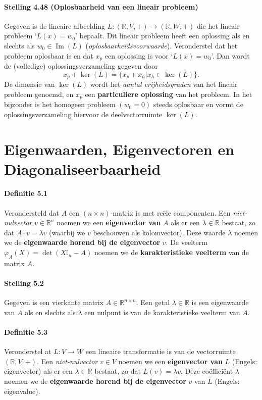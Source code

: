 \documentclass[11pt,oneside,a4paper]{article}
\DeclareMathOperator{\Ima}{Im}
\begin{document}
	\paragraph{Stelling 4.48 (Oplosbaarheid van een lineair probleem)}
		Gegeven is de lineaire afbeelding $L: (\mathbb{R}, V, +) \to (\mathbb{R}, W, +)$ die het lineair probleem `$L(x) = w_0$' bepaalt. Dit lineair probleem heeft een oplossing als en slechts als $w_0 \in \Ima(L)$ (\textit{oplosbaarheidsvoorwaarde}). Veronderstel dat het probleem oplosbaar is en dat $x_p$ een oplossing is voor `$L(x) = w_0$'. Dan wordt de (volledige) oplossingsverzameling gegeven door $$x_p + \ker(L) = \{x_p + x_h | x_h \in \ker(L)\}.$$ De dimensie van $\ker(L)$ wordt het \textit{aantal vrijheidsgraden} van het lineair probleem genoemd, en $x_p$ een \textbf{particuliere oplossing} van het probleem. In het bijzonder is het homogeen probleem $(w_0 = 0)$ steeds oplosbaar en vormt de oplossingsverzameling hiervoor de deelvectorruimte $\ker(L)$.
	
	\section{Eigenwaarden, Eigenvectoren en Diagonaliseerbaarheid}
	
	\paragraph{Definitie 5.1}
		Verondersteld dat $A$ een $(n\times n)$-matrix is met reële componenten. Een \textit{niet-nulvector} $v\in \mathbb{R}^n$ noemen we een \textbf{eigenvector van} $A$ als er een $\lambda \in \mathbb{R}$ bestaat, zo dat $A\cdot v = \lambda v$ (waarbij we $v$ beschouwen als kolomvector). Deze waarde $\lambda$ noemen we de \textbf{eigenwaarde horend bij de eigenvector} $v$. De veelterm $\varphi_A(X)=\det(X \mathbb{I}_n -A)$ noemen we de \textbf{karakteristieke veelterm} van de matrix $A$.
	\paragraph{Stelling 5.2}
		Gegeven is een vierkante matrix $A \in \mathbb{R}^{n \times n}$. Een getal $\lambda \in \mathbb{R}$ is een eigenwaarde van $A$ als en slechts als $\lambda$ een nulpunt is van de karakteristieke veelterm van $A$.
	\paragraph{Definitie 5.3}
		Veronderstel at $L:V\to W$ een lineaire transformatie is van de vectorruimte $(\mathbb{R}, V, +)$. Een \textit{niet-nulvector} $v \in V$ noemen we een \textbf{eigenvector van} $L$ (Engels: eigenvector) als er een $\lambda \in \mathbb{R}$ bestaat, zo dat $L(v) = \lambda v$. Deze coëfficiënt $\lambda$ noemen we de \textbf{eigenwaarde horend bij de eigenvector} $v$ van $L$ (Engels: eigenvalue).
\end{document}
